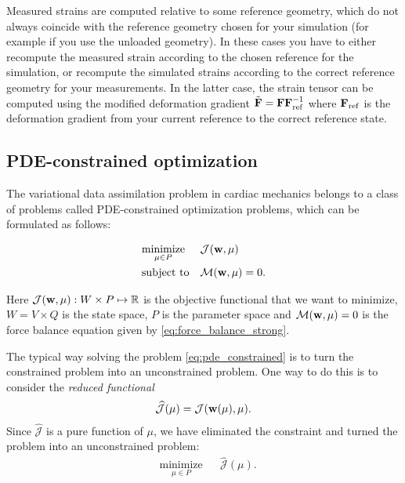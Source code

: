 \begin{remark}
  Measured strains are computed relative to some reference
  geometry, which do not always coincide with the reference geometry
  chosen for your simulation (for example if you use the unloaded geometry). In
  these cases you have to either recompute the measured strain
  according to the chosen reference for the simulation, or recompute
  the simulated strains according to the correct reference geometry for
  your measurements. In the latter case, the strain tensor can be
  computed using the modified deformation gradient $\tilde{\mathbf{F}} = \mathbf{F}
  \mathbf{F}_{\mathrm{ref}}^{-1}$ where $\mathbf{F}_{\mathrm{ref}}$ is the deformation
  gradient from your current reference to the correct reference state. 
\end{remark}


\subsection{PDE-constrained optimization}


The variational data assimilation problem in cardiac mechanics belongs
to a class of problems called PDE-constrained optimization problems,
which can be formulated as follows:

\begin{equation}
  \begin{aligned}
    \label{eq:pde_constrained}
    & \underset{\mu \in P}{\text{minimize}}
    & &  \mathcal{J}(\mathbf{w}, \mu) \\
    & \text{subject to}
    & & \mathcal{M}(\mathbf{w}, \mu) = 0.
  \end{aligned}
\end{equation}

Here $\mathcal{J}(\mathbf{w}, \mu): W \times P \mapsto
\mathbb{R}$ is the objective functional that we want to minimize,
$W = V \times Q$ is the state space, $P$ is the parameter space
and $ \mathcal{M}(\mathbf{w}, \mu) = 0$ is the force balance
equation given by \eqref{eq:force_balance_strong}.



The typical way solving the problem \eqref{eq:pde_constrained} is to
turn the constrained problem into an unconstrained problem. One way
to do this is to consider the \emph{reduced functional}
\begin{align}
  \widehat{\mathcal{J}}(\mu) = \mathcal{J}(\mathbf{w}(\mu), \mu).
\end{align}
Since $\widehat{\mathcal{J}}$ is a pure function of $\mu$, we have
eliminated the constraint and turned the problem into an unconstrained
problem:
\begin{equation}
  \begin{aligned}
    \label{eq:pde_unconstrained}
    & \underset{\mu \in P}{\text{minimize}}
    & &  \widehat{\mathcal{J}}(\mu).
  \end{aligned}
\end{equation}

